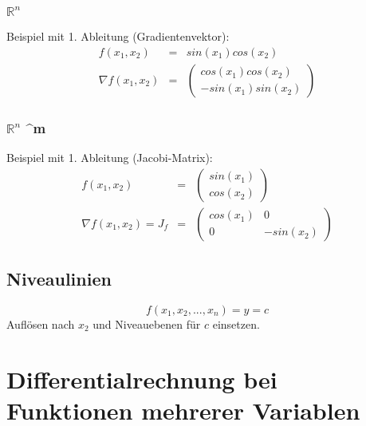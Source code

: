 \documentclass[a4paper,11pt]{article}
\begin{document}
	\subsubsection{$\mathbb{R}^n$ \rightarrow {}}
	\label{ssub:r_rightarrow_r}
	Beispiel mit 1. Ableitung (Gradientenvektor):
	\begin{eqnarray*}
		f(x_1,x_2) &=& sin(x_1)cos(x_2) \\
		\nabla f(x_1,x_2) &=& \left( \begin{array}{c} cos(x_1) cos(x_2) \\ -sin(x_1)sin(x_2) \end{array} \right)
	\end{eqnarray*}
		
	\subsubsection{$\mathbb{R}^n$ \rightarrow {}^m}
	\label{ssub:r_rightarrow_r}
	Beispiel mit 1. Ableitung (Jacobi-Matrix): 
	\begin{eqnarray*}
		f(x_1,x_2) &=& \left(\begin{array}{c} sin(x_1) \\ cos(x_2)\end{array}\right) \\
		\nabla f(x_1,x_2) = J_f &=& \left( \begin{array}{cc} cos(x_1) & 0 \\ 0 & -sin(x_2) \end{array} \right)
	\end{eqnarray*}	
	
	\subsection{Niveaulinien} %
	\label{sub:niveaulinien}
	
	\begin{equation}
		f(x_1,x_2,...,x_n) = y = c
	\end{equation}
	Auflösen nach $x_2$ und Niveauebenen für $c$ einsetzen.
	
	
	
	\pagebreak
	
	\section{Differentialrechnung bei Funktionen mehrerer Variablen} %
	\label{sec:differentialrechnung_bei_funktionen_mehrerer_variablen}
	
\end{document}
